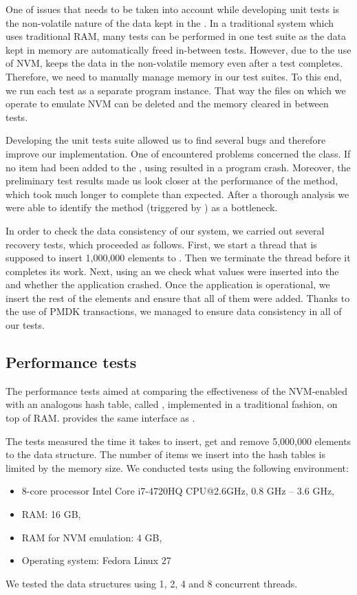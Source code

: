    One of issues that needs to be taken into account while developing unit tests is the non-volatile nature of the data kept in the \NvmHashMap. In a traditional system which uses traditional RAM, many tests can be performed in one test suite as the data kept in memory are automatically freed in-between tests. However, due to the use of NVM, \PHT keeps the data in the non-volatile memory even after a test completes. Therefore, we need to manually manage memory in our test suites. To this end, we run each test as a separate program instance. That way the files on which we operate to emulate NVM can be deleted and the memory cleared in between tests.  

    Developing the unit tests suite allowed us to find several bugs and therefore improve our implementation. One of encountered problems concerned the \Iterator class. If no item had been added to the \PHT, using \Iterator resulted in a program crash. Moreover, the preliminary test results made us look closer at the performance of the \insertMethod method, which took much longer to complete than expected. After a thorough analysis we were able to identify the \expandMethod method (triggered by \insertMethod) as a bottleneck.

    In order to check the data consistency of our system, we carried out several recovery tests, which proceeded as follows. First, we start a thread that is supposed to insert 1,000,000 elements to \PHT. Then we terminate the thread before it completes its work. Next, using an \Iterator we check what values were inserted into the \PHT and whether the application crashed. Once the application is operational, we insert the rest of the elements and ensure that all of them were added. Thanks to the use of PMDK transactions, we managed to ensure data consistency in all of our tests.
    
\subsection{Performance tests}

    The performance tests aimed at comparing the effectiveness of the NVM-enabled \PHT with an analogous hash table, called \StandardHashMap, implemented in a traditional fashion, on top of RAM. \StandardHashMap provides the same interface as \NvmHashMap.
    
    The tests measured the time it takes to insert, get and remove 5,000,000 elements to the data structure. The number of items we insert into the hash tables is limited by the memory size. We conducted tests using the following environment:
    \begin{itemize}
        \item 8-core processor Intel Core i7-4720HQ CPU@2.6GHz, 0.8 GHz -- 3.6 GHz,
        \item RAM: 16 GB,
        \item RAM for NVM emulation: 4 GB,
        \item Operating system: Fedora Linux 27
    \end{itemize}
    We tested the data structures using 1, 2, 4 and 8 concurrent threads. 
    
